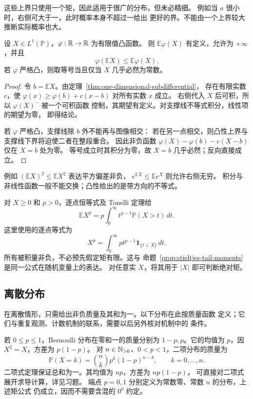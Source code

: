 这些上界只使用一个矩，因此适用于很广的分布，但未必精细。
例如当 \(a\) 很小时，右侧可大于一，此时概率本身不超过一给出
更好的界。不能由一个上界较大推断实际概率也大。

\begin{theorem}\label{thm:probability-jensen}
设 \(X\in L^1(\mathbb P)\)，\(\varphi:\mathbb{R}\to\mathbb{R}\) 为有限值凸函数。
则 \(\mathbb E\varphi(X)\) 有定义，允许为 \(+\infty\)，并且
\[
 \varphi(\mathbb E X)\le\mathbb E\varphi(X).
\]
若 \(\varphi\) 严格凸，则取等号当且仅当 \(X\) 几乎必然为常数。
\end{theorem}
\begin{proof}
令 \(b=\mathbb E X\)。由定理~\ref{thm:one-dimensional-subdifferential}，
存在有限实数 \(c\)，使
\(\varphi(x)\ge\varphi(b)+c(x-b)\) 对所有实数 \(x\) 成立。
右侧代入 \(X\) 后可积，所以 \(\varphi(X)^-\) 被一个可积函数
控制，其期望有定义。对支撑线不等式积分，线性项的期望为零，
即得结论。

若 \(\varphi\) 严格凸，支撑线除 \(b\) 外不能再与图像相交：
若在另一点相交，则凸性上界与支撑线下界将迫使二者在整段重合。
因此非负函数
\(\varphi(X)-\varphi(b)-c(X-b)\) 仅在 \(X=b\) 处为零。
等号成立时其积分为零，故 \(X=b\) 几乎必然；反向直接成立。
\end{proof}

例如 \((\mathbb E X)^2\le\mathbb E X^2\) 表达平方偏差非负，
\(e^{\mathbb E X}\le\mathbb E e^X\) 则允许右侧无穷。
积分与非线性函数一般不能交换；凸性给出的是带方向的不等式。

对 \(X\ge0\) 和 \(p>0\)，逐点恒等式及 Tonelli 定理给
\begin{equation}\label{eq:probability-tail-integral}
 \mathbb E X^p
 =p\int_0^\infty t^{p-1}\mathbb P(X>t)\,dt.
\end{equation}
这里使用的逐点等式为
\[
 X^p=\int_0^\infty pt^{p-1}\mathbf1_{\{t<X\}}\,dt.
\]
所有被积量非负，不必预先假定矩有限。这与
命题~\ref{prop:stieltjes-tail-moments}是同一公式在随机变量上的表达。
对任意实 \(X\)，将其用于 \(|X|\) 即可判断绝对矩。

\subsection{离散分布}

在离散情形，只需给出非负质量及其和为一。以下分布在此按质量函数
定义；它们与重复观测、计数机制的联系，需要以后另外核对机制中的
条件。

\begin{example}
若 \(0\le p\le1\)，Bernoulli 分布在零和一的质量分别为
\(1-p,p\)。它的均值为 \(p\)，因 \(X^2=X\)，方差为 \(p(1-p)\)。
对 \(n\in\mathbb{N}_{>0}\)、\(0<p<1\)，二项分布的质量为
\[
 \mathbb P(X=k)=\binom nk p^k(1-p)^{n-k},\qquad k=0,\ldots,n.
\]
二项式定理保证总和为一。其均值为 \(np\)，方差为 \(np(1-p)\)，
可直接对二项式展开求导计算，详见习题。
端点 \(p=0,1\) 分别定义为常数零、常数 \(n\) 的分布，上述矩公式
仍成立，因而不需要含混的 \(0^0\) 约定。
\end{example}


